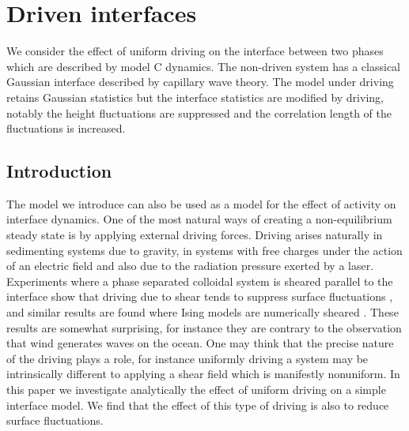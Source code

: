 \chapter{Driven interfaces}
We consider the effect of uniform driving on the interface between two phases which are described by model C dynamics. The non-driven system has a classical Gaussian interface described by capillary wave theory. The model under driving retains Gaussian statistics but the interface statistics are modified by driving, notably the height fluctuations are suppressed and  the correlation length of the fluctuations is increased.

    \section{Introduction}

The model we introduce can also be used as a model for the effect of activity on interface dynamics.
One of the most natural ways of creating a non-equilibrium steady state is by applying external  driving forces. Driving arises naturally in sedimenting systems due to gravity, in systems with free charges under the action of an electric field and also  due to the radiation pressure exerted by a laser. Experiments where a phase separated colloidal system is sheared parallel to the interface show that  driving due to shear tends to suppress surface fluctuations \cite{derks_suppression_2006}, and similar results are found where Ising models are numerically sheared  \cite{smith_interfaces_2008-1,smith_driven_2010}. These results are somewhat surprising, for instance they are contrary to the  observation that wind generates waves on the ocean. One may think that the precise nature of the driving plays a role, for instance uniformly driving a system may be intrinsically different to applying a shear field which is manifestly nonuniform. In this paper we investigate analytically the effect of uniform driving on a simple interface model. We find that the effect of this type of  driving is also to reduce surface fluctuations.

